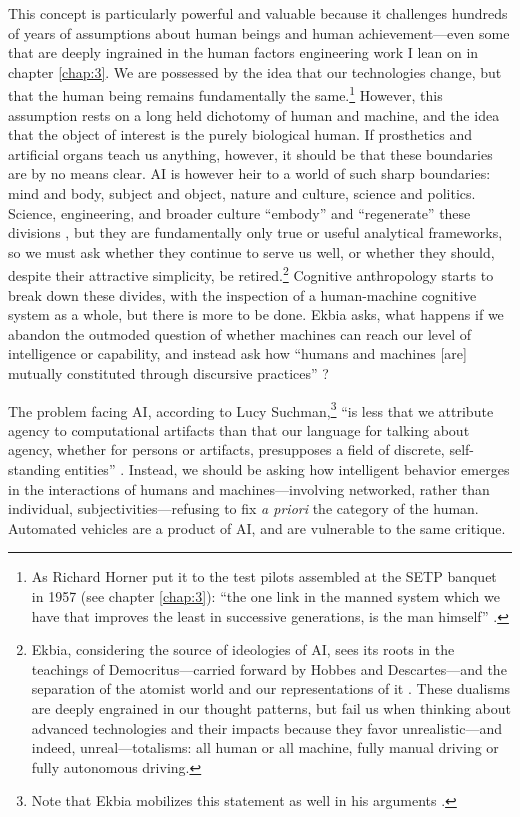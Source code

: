 This concept is particularly powerful and valuable because it
challenges hundreds of years of assumptions about human beings and
human achievement---even some that are deeply ingrained in the human
factors engineering work I lean on in chapter \ref{chap:3}. We are
possessed by the idea that our technologies change, but that the human
being remains fundamentally the same.\footnote{As Richard Horner put
  it to the test pilots assembled at the SETP banquet in 1957 (see
  chapter \ref{chap:3}): ``the
  one link in the manned system which we have that improves the least
  in successive generations, is the man himself'' \cite[p.
    19]{DM}.} However, this assumption rests on a long held 
dichotomy of human and machine, and the idea that the object of
interest is the purely biological human. If prosthetics and artificial
organs teach us anything, however, it should be that these boundaries
are by no means clear. AI is however heir to a world of such sharp
boundaries: mind and body, subject
and object, nature and culture, science and politics. Science, engineering, and broader culture ``embody'' and
``regenerate'' these divisions \cite[p. 327]{ekbia}, but they are
fundamentally only true or useful analytical frameworks, so we must
ask whether they continue to serve us well, or whether they should,
despite their attractive simplicity, be retired.\footnote{Ekbia,
  considering the source of ideologies of AI, sees its roots in 
the teachings of Democritus---carried forward by Hobbes
and Descartes---and the separation of the atomist world and our
representations of it \cite[p. 331]{ekbia}. These dualisms are deeply
engrained in our 
thought patterns, but fail us when thinking about advanced
technologies and their impacts because they favor unrealistic---and
indeed, unreal---totalisms: all human or all machine, fully manual driving or fully
autonomous driving.} Cognitive
anthropology starts to break down these 
divides, with the inspection of a human-machine cognitive system as a
whole, but there is more to be done. Ekbia asks, what happens if we
abandon the outmoded question of whether machines can reach our level
of intelligence or capability, and instead ask how  ``humans and machines
[are] mutually constituted through discursive practices'' \cite[p.
  328]{ekbia}?


The problem facing AI, according to Lucy Suchman,\footnote{Note that
  Ekbia mobilizes this statement as well in his arguments
  \cite[p. 331-332]{ekbia}.} ``is less that we attribute agency to
computational artifacts than that our language for talking about
agency, whether for persons or artifacts, presupposes a field of
discrete, self-standing entities'' \cite[p. 263]{SuchmanPlans}.
Instead, we should be asking how intelligent behavior emerges in
the interactions of
humans and machines---involving networked, rather than individual,
subjectivities---refusing to fix \emph{a priori} the category of 
the human. Automated vehicles are a product of AI, and are vulnerable
to the same critique. 




